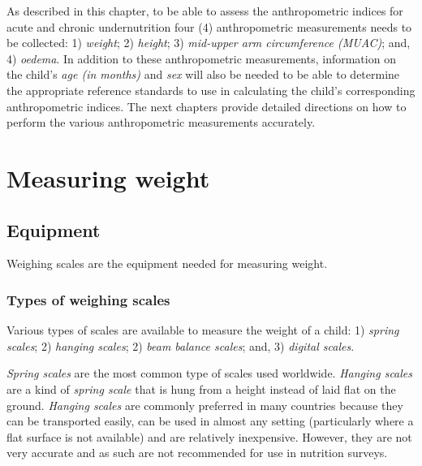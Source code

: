\documentclass[
  12pt,
]{book}
\begin{document}
As described in this chapter, to be able to assess the anthropometric indices for acute and chronic undernutrition four (4) anthropometric measurements needs to be collected: 1) \emph{weight}; 2) \emph{height}; 3) \emph{mid-upper arm circumference (MUAC)}; and, 4) \emph{oedema}. In addition to these anthropometric measurements, information on the child's \emph{age (in months)} and \emph{sex} will also be needed to be able to determine the appropriate reference standards to use in calculating the child's corresponding anthropometric indices. The next chapters provide detailed directions on how to perform the various anthropometric measurements accurately.

\hypertarget{weight}{%
\chapter{Measuring weight}\label{weight}}

\hypertarget{equipment}{%
\section{Equipment}\label{equipment}}

Weighing scales are the equipment needed for measuring weight.

\hypertarget{types-of-weighing-scales}{%
\subsection{Types of weighing scales}\label{types-of-weighing-scales}}

Various types of scales are available to measure the weight of a child: 1) \emph{spring scales}; 2) \emph{hanging scales}; 2) \emph{beam balance scales}; and, 3) \emph{digital scales}.

\emph{Spring scales} are the most common type of scales used worldwide. \emph{Hanging scales} are a kind of \emph{spring scale} that is hung from a height instead of laid flat on the ground. \emph{Hanging scales} are commonly preferred in many countries because they can be transported easily, can be used in almost any setting (particularly where a flat surface is not available) and are relatively inexpensive. However, they are not very accurate and as such are not recommended for use in nutrition surveys.
\end{document}
